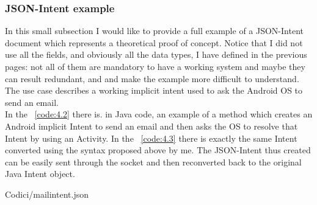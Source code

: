 \subsubsection{JSON-Intent example}
In this small subsection I would like to provide a full example of a JSON-Intent document which represents a theoretical proof of concept. Notice that I did not use all the fields, and obviously all the data types, I have defined in the previous pages: not all of them are
mandatory to have a working system and maybe they can result redundant, and and make the example more difficult to understand.\\
The use case describes a working implicit intent used to ask the Android OS to send an email.\\
In the \lstlistingname~\ref{code:4.2} there is. in Java code, an example of a method which creates an Android implicit Intent to send an email and then asks the OS to resolve that Intent by using an Activity. In the \lstlistingname~\ref{code:4.3} there is exactly the same Intent converted using the syntax proposed above by me. The JSON-Intent thus created can be easily sent through the socket and then reconverted back to the original Java Intent object.

\begin{lstinputlisting}[
	language=JSON,
	caption={Conversion of the Intent in Listing \ref{code:4.2} to JSON-Intent},
	label=code:4.3]
	{Codici/mailintent.json}
\end{lstinputlisting}
